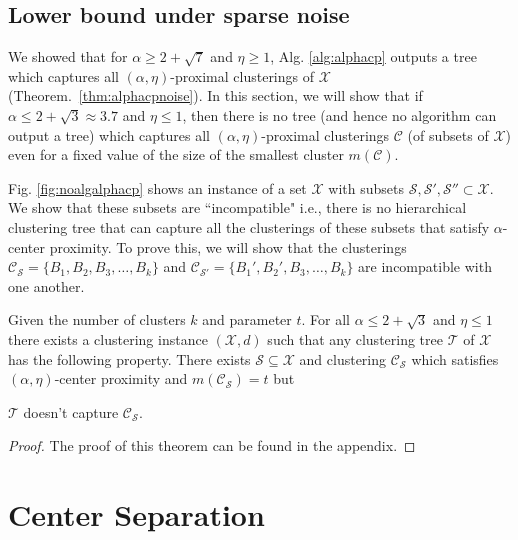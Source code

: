\documentclass[anon,12pt]{colt2016} %
\newcommand{\mc}{\mathcal}
\begin{document}
\subsection{Lower bound under sparse noise}
\label{section:alphaLowerBoundSparse}

We showed that for $\alpha \ge 2 + \sqrt{7}$ and $\eta \ge 1$, Alg. \ref{alg:alphacp} outputs a tree which captures all $(\alpha, \eta)$-proximal clusterings of $\mc X$ (Theorem.~\ref{thm:alphacpnoise}). In this section, we will show that if $\alpha \le 2 + \sqrt{3} \approx 3.7$ and $\eta \le 1$, then there is no tree (and hence no algorithm can output a tree) which captures all $(\alpha, \eta)$-proximal clusterings $\mc C$ (of subsets of $\mc X$) even for a fixed value of the size of the smallest cluster $m(\mc C)$.

Fig. \ref{fig:noalgalphacp} shows an instance of a set $\mc X$ with subsets $\mc S, \mc S', \mc S'' \subset \mc X$. We show that these subsets are ``incompatible" i.e., there is no  hierarchical clustering tree that can capture all the clusterings of these subsets that satisfy $\alpha$-center proximity. To prove this, we will show that the clusterings $\mc C_{\mc S} = \{B_1, B_2, B_3, \ldots, B_k\}$ and $\mc C_{\mc S'} = \{B_1', B_2', B_3, \ldots, B_k\}$ are incompatible with one another.

\begin{theorem}
\label{thm:noalgalphacp}
Given the number of clusters $k$ and parameter $t$. For all $\alpha \le 2+\sqrt{3}$ and $\eta \le 1$ there exists a clustering instance $(\mc X, d)$ such that any clustering tree $\mc T$ of $\mc X$ has  the following property. There exists $\mc S \subseteq \mc X$ and clustering $\mc C_{\mc S}$ which satisfies $(\alpha, \eta)$-center proximity and $ m(\mc C_{\mc S}) = t$ but 

$\mc T$ doesn't capture $\mc C_{\mc S}$.
\end{theorem}

\begin{proof}
The proof of this theorem can be found in the appendix.
\end{proof}




\section{Center Separation}
\label{sec:cs}
 
\end{document}

